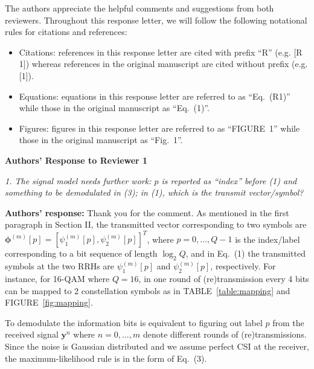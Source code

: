 \documentclass[onecolumn, 11pt, draftclsnofoot]{IEEEtran}
\begin{document}
The authors appreciate the helpful comments and suggestions from both reviewers. 
Throughout this response letter, we will follow the following notational
rules for citations and references:
\begin{itemize}
  \item Citations: references in this response letter are cited with prefix
  ``R'' (e.g. [R 1]) whereas references in the original manuscript are cited
  without prefix (e.g. [1]).
  \item Equations: equations in this response letter are referred to as
  ``Eq.~(R1)''  while those in the original manuscript as ``Eq.~(1)''.
  \item Figures: figures in this response letter are referred to as
  ``FIGURE~1''  while those in the original manuscript as ``Fig.~1''.
\end{itemize}

\begin{center}
  {\LARGE \textbf{Authors' Response to Reviewer 1}}
\end{center}


\noindent
\emph{1. The signal model needs further work: $p$ is reported as “index” before
(1) and something to be demodulated in (3); in (1), which is the transmit
vector/symbol? }

\noindent \textbf{Authors' response:}
Thank you for the comment. As mentioned in the first paragraph in Section
II, the transmitted vector corresponding to two symbols are
$\bm{\phi}^(m)[p] = [\psi_1^{(m)}[p], \psi_2^{(m)}[p]]^T$, where
$p=0,\ldots,Q-1$ is the index/label corresponding to a bit sequence of length
$\log_2Q$, and in Eq.~(1) the transmitted symbols at the two RRHs are
$\psi_1^{(m)}[p]$ and $\psi_2^{(m)}[p]$, respectively. For instance, for 16-QAM where $Q=16$, in
one round of (re)transmission every 4 bits can be mapped to 2 constellation
symbols as in TABLE~\ref{table:mapping} and FIGURE~\ref{fig:mapping}.

To demodulate the information bits is equivalent to figuring out label $p$ from
the received signal $\mathbf{y}^{n}$ where $n=0,\ldots,m$ denote different
rounds of (re)transmissions. Since the noise is Gaussian distributed and we
assume perfect CSI at the receiver, the maximum-likelihood rule is in the form
of Eq.~(3).
\end{document}
